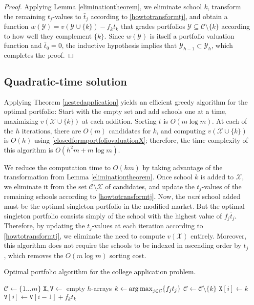 \begin{proof}
Applying Lemma \ref{eliminationtheorem}, we eliminate school $k$, transform the remaining $t_j$-values to $\bar t_j$ according to \eqref{howtotransformtj}, and obtain a function $w(\mathcal{Y}) = v(\mathcal{Y} \cup \{k\}) - f_k t_k$ that grades portfolios $\mathcal{Y} \subseteq \mathcal{C} \setminus \{k\}$ according to how well they complement $\{k\}$. Since $w(\mathcal{Y})$ is itself a portfolio valuation function and $\bar t_0 = 0$, the inductive hypothesis implies that $\mathcal{Y}_{h-1} \subset \mathcal{Y}_h$, which completes the proof.
\end{proof}




\subsection{Quadratic-time solution}

Applying Theorem \ref{nestedapplication} yields an efficient greedy algorithm for the optimal portfolio: Start with the empty set and add schools one at a time, maximizing $v(\mathcal{X}\cup \{k\})$ at each addition. Sorting $t$ is  $O(m \log m)$.  At each of the $h$ iterations, there are $O(m)$ candidates for $k$, and computing $v(\mathcal{X}\cup \{k\})$ is $O(h)$ using \eqref{closedformportfoliovaluationX}; therefore, the time complexity of this algorithm is $O(h^2 m + m \log m)$. 

We reduce the computation time to $O(hm)$ by taking advantage of the transformation from Lemma \ref{eliminationtheorem}. Once school $k$ is added to $\mathcal{X}$, we eliminate it from the set $\mathcal{C}\setminus \mathcal{X}$ of candidates, and update the $t_j$-values of the remaining schools according to \eqref{howtotransformtj}. Now, the \emph{next} school added must be the optimal singleton portfolio in the modified market. But the optimal singleton portfolio consists simply of the school with the highest value of $f_j \bar t_j$. Therefore, by updating the $t_j$-values at each iteration according to \eqref{howtotransformtj}, we eliminate the need to compute $v(\mathcal{X})$ entirely. Moreover, this algorithm does not require the schools to be indexed in ascending order by $t_j$, which removes the $O(m\log m)$ sorting cost.

\begin{algorithm}[h] 
\caption{Optimal portfolio algorithm for the college application problem.} \label{algorithmforlargeh}
\KwIn{Utility values $t \in(0, \infty)^m$, admissions probabilities $f \in (0, 1]^m$, application limit $h \leq m$.}
$\mathcal{C} \gets \{1 \dots m\}$\;
$\mathtt{X, V} \gets $ empty $h$-arrays\;
{
    $k \gets \operatorname*{arg\,max}_{j \in \mathcal{C}}\{f_j t_j\}$\;
    $\mathcal{C} \gets \mathcal{C} \setminus \{k\}$\;
    $\mathtt{X}[i] \gets k$\;
     {$\mathtt{V}[i] \gets \mathtt{V}[i-1] + f_k t_k$}
	{
	}
}
\end{algorithm}


